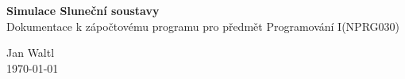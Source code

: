 \begin{titlepage}
	\begin{center}
		\vspace*{8cm}
		\Huge{\textbf{Simulace Sluneční soustavy}}\\
		\vspace*{1cm}
		{\Large Dokumentace k zápočtovému programu pro předmět Programování I(NPRG030)}\\
		\vfill
		
		\huge{Jan Waltl}\\
		\huge{\today}
	\end{center}
\end{titlepage}
	

